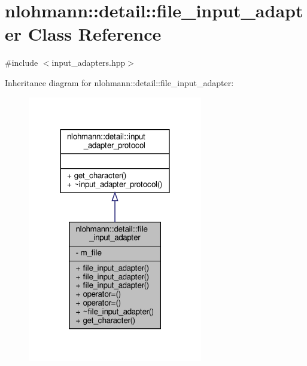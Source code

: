 \hypertarget{classnlohmann_1_1detail_1_1file__input__adapter}{}\section{nlohmann\+:\+:detail\+:\+:file\+\_\+input\+\_\+adapter Class Reference}
\label{classnlohmann_1_1detail_1_1file__input__adapter}


{\ttfamily \#include $<$input\+\_\+adapters.\+hpp$>$}



Inheritance diagram for nlohmann\+:\+:detail\+:\+:file\+\_\+input\+\_\+adapter\+:
\nopagebreak
\begin{figure}[H]
\begin{center}
\leavevmode
\includegraphics[width=216pt]{classnlohmann_1_1detail_1_1file__input__adapter__inherit__graph}
\end{center}
\end{figure}


